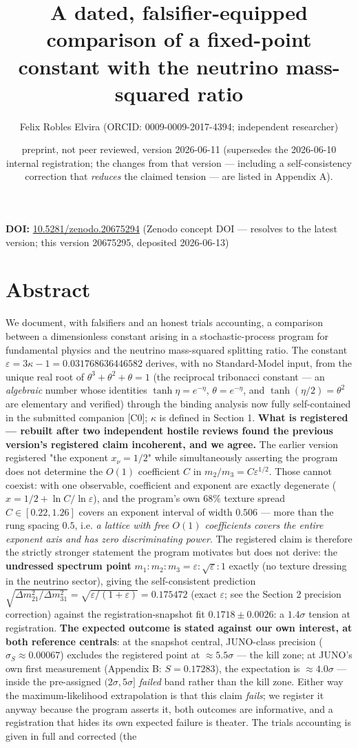\documentclass[11pt]{article}
\title{A dated, falsifier-equipped comparison of a fixed-point constant with the neutrino mass-squared ratio}
\author{Felix Robles Elvira (ORCID: 0009-0009-2017-4394; independent researcher)}
\date{\small preprint, not peer reviewed, version 2026-06-11 (supersedes the 2026-06-10 internal registration; the changes from that version — including a self-consistency correction that \emph{reduces} the claimed tension — are listed in Appendix A).}
\begin{document}
\maketitle

\textbf{DOI:} \href{https://doi.org/10.5281/zenodo.20675294}{10.5281/zenodo.20675294} (Zenodo concept DOI — resolves to the latest version; this version 20675295, deposited 2026-06-13)

\section*{Abstract}
We document, with falsifiers and an honest trials accounting, a comparison between a dimensionless constant arising in a stochastic-process program for fundamental physics and the neutrino mass-squared splitting ratio.  The constant $\varepsilon = 3\kappa - 1 = 0.031768636446582$ derives, with no Standard-Model input, from the unique real root of $\theta^3 + \theta^2 + \theta = 1$ (the reciprocal tribonacci constant — an \emph{algebraic} number whose identities $\tanh\eta = e^{-\eta}$, $\theta = e^{-\eta}$, and $\tanh(\eta/2) = \theta^2$ are elementary and verified) through the binding analysis now fully self-contained in the submitted companion [C0]; $\kappa$ is defined in Section 1. \textbf{What is registered — rebuilt after two independent hostile reviews found the previous version's registered claim incoherent, and we agree.}  The earlier version registered "the exponent $x_\nu = 1/2$" while simultaneously asserting the program does not determine the $O(1)$ coefficient $C$ in $m_2/m_3 = C\varepsilon^{1/2}$.  Those cannot coexist: with one observable, coefficient and exponent are exactly degenerate ($x = 1/2 + \ln C/\ln\varepsilon$), and the program's own $68\%$ texture spread $C \in [0.22, 1.26]$ covers an exponent interval of width $0.506$ — more than the rung spacing $0.5$, i.e. \emph{a lattice with free $O(1)$ coefficients covers the entire exponent axis and has zero discriminating power}.  The registered claim is therefore the strictly stronger statement the program motivates but does not derive: the \textbf{undressed spectrum point} $m_1 : m_2 : m_3 = \varepsilon : \sqrt\varepsilon : 1$ exactly (no texture dressing in the neutrino sector), giving the self-consistent prediction $\sqrt{\Delta m^2_{21}/\Delta m^2_{31}} = \sqrt{\varepsilon/(1+\varepsilon)} = 0.175472$ (exact $\varepsilon$; see the Section 2 precision correction) against the registration-snapshot fit $0.1718 \pm 0.0026$: a $1.4\sigma$ tension at registration.  \textbf{The expected outcome is stated against our own interest, at both reference centrals}: at the snapshot central, JUNO-class precision ($\sigma_S \approx 0.00067$) excludes the registered point at $\approx 5.5\sigma$ — the kill zone; at JUNO's own first measurement (Appendix B: $S = 0.17283$), the expectation is $\approx 4.0\sigma$ — inside the pre-assigned $(2\sigma, 5\sigma]$ \emph{failed} band rather than the kill zone. Either way the maximum-likelihood extrapolation is that this claim \emph{fails}; we register it anyway because the program asserts it, both outcomes are informative, and a registration that hides its own expected failure is theater.  The trials accounting is given in full and corrected (the 
\end{document}
